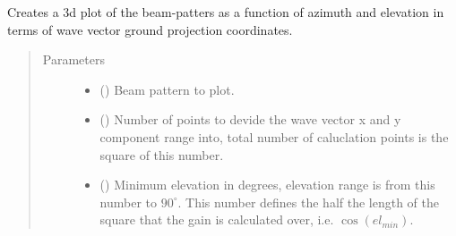 \documentclass[letterpaper,10pt,english]{sphinxmanual}
\begin{document}
\begin{fulllineitems}
\label{\detokenize{modules/antenna:antenna.plot_gain3d}}
Creates a 3d plot of the beam-patters as a function of azimuth and elevation in terms of wave vector ground projection coordinates.
\begin{quote}\begin{description}
\item[{Parameters}] \leavevmode\begin{itemize}
\item {} 
 ({\hyperref[\detokenize{modules/antenna:antenna.BeamPattern}]{}}) \textendash{} Beam pattern to plot.

\item {} 
 () \textendash{} Number of points to devide the wave vector x and y component range into, total number of caluclation points is the square of this number.

\item {} 
 () \textendash{} Minimum elevation in degrees, elevation range is from this number to \(90^\circ\). This number defines the half the length of the square that the gain is calculated over, i.e. \(\cos(el_{min})\).

\end{itemize}

\end{description}\end{quote}

\end{fulllineitems}

\end{document}
